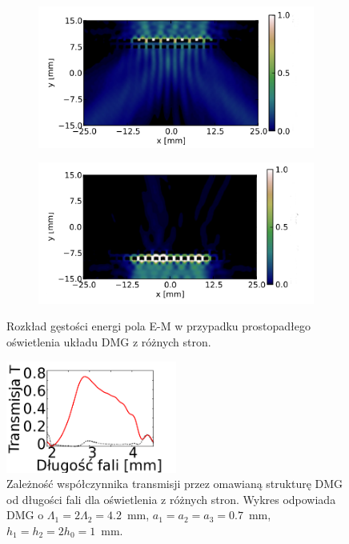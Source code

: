 \begin{figure}
	\begin{subfigure}{0.9\textwidth}
		\includegraphics[width=\textwidth]{images/thz/opt_lett_gora.png}
		\label{fig:trans_gora}
	\end{subfigure}

	\begin{subfigure}{0.9\textwidth}
		\includegraphics[width=\textwidth]{images/thz/opt_letters_dol.png}
		\label{fig:trans_dol}
	\end{subfigure}
	\caption{Rozkład gęstości energi pola E-M w przypadku prostopadłego oświetlenia układu DMG z różnych stron. }
	\label{fig:tras_gora_dol}
\end{figure}

\begin{figure}	
	\centering
	\includegraphics[width=0.5\textwidth]{images/thz/opt_lett_spect.png}
	\caption{Zależność współczynnika transmisji przez omawianą strukturę DMG od długości fali dla oświetlenia z różnych stron. Wykres odpowiada DMG o $\Lambda_1= 2 \Lambda_2 = 4.2$~mm, $a_1=a_2=a_3=0.7$~mm, $h_1=h_2=2 h_0=1$~mm.}
	\label{fig:trans_freq}

\end{figure}
